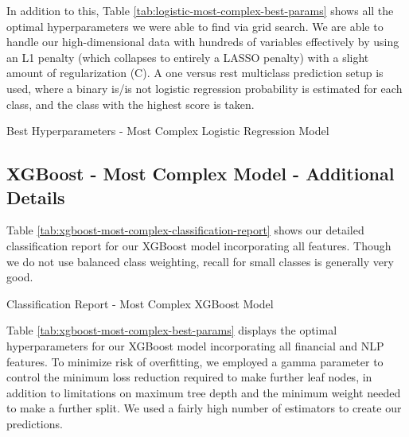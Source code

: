 \documentclass{article}[11pt]
\begin{document}
    In addition to this, Table \ref{tab:logistic-most-complex-best-params} shows all the optimal hyperparameters we were able to find via grid search. We are able to handle our high-dimensional data with hundreds of variables effectively by using an L1 penalty (which collapses to entirely a LASSO penalty) with a slight amount of regularization (C). A one versus rest multiclass prediction setup is used, where a binary is/is not logistic regression probability is estimated for each class, and the class with the highest score is taken.

    \begin{table}[h!]
        \centering
        \caption{Best Hyperparameters - Most Complex Logistic Regression Model}
        
        \label{tab:logistic-most-complex-best-params}
    \end{table}

    \clearpage
    \newpage

    \subsection{XGBoost - Most Complex Model - Additional Details}

    \label{sec:xgboost-most-complex-model-additional-details}

    Table \ref{tab:xgboost-most-complex-classification-report} shows our detailed classification report for our XGBoost model incorporating all features. Though we do not use balanced class weighting, recall for small classes is generally very good.

    \begin{table}[h!]
        \centering
        \caption{Classification Report - Most Complex XGBoost Model}
        
        \label{tab:xgboost-most-complex-classification-report}
    \end{table}

    Table \ref{tab:xgboost-most-complex-best-params} displays the optimal hyperparameters for our XGBoost model incorporating all financial and NLP features. To minimize risk of overfitting, we employed a gamma parameter to control the minimum loss reduction required to make further leaf nodes, in addition to limitations on maximum tree depth and the minimum weight needed to make a further split. We used a fairly high number of estimators to create our predictions.
\end{document}
